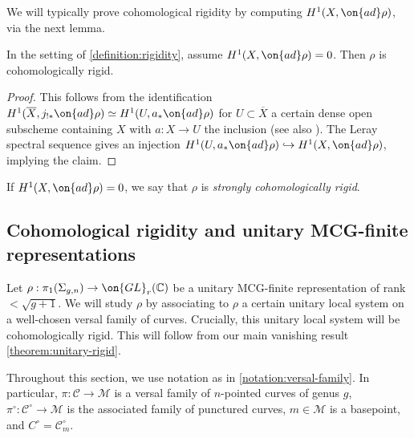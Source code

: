 We will typically prove cohomological rigidity by computing
$H^1(X, \on{ad}\rho)$, via the next lemma.
\begin{lemma}
\notready
	\label{lemma:vanishing-h1-implies-rigidity}
		In the setting of \autoref{definition:rigidity}, assume $H^1(X, \on{ad}\rho)
	= 0$. Then $\rho$ is
	cohomologically rigid.
\end{lemma}
\begin{proof}
	This follows from the identification
	$H^1(\overline{X}, j_{!*}\on{ad}\rho)\simeq H^1(U, a_*\on{ad}\rho)$ for
	$U \subset \overline{X}$ a certain dense open subscheme containing $X$
	with $a: X \to U$ the inclusion \cite[Remark
	2.4]{esnault2018cohomologically} (see also \cite[Remark
	4.8]{klevdalP:g-rigid-local-systems-are-integral}).
	The Leray spectral sequence gives an injection
	$H^1(U, a_*\on{ad}\rho) \hookrightarrow H^1(X, \on{ad}\rho)$, implying
	the claim.
\end{proof}
\begin{definition}
\notready
If $H^1(X, \on{ad}\rho)=0$, we say that $\rho$ is \emph{strongly cohomologically rigid}.
\end{definition}
\subsection{Cohomological rigidity and unitary MCG-finite representations}
\label{subsection:rigidity}

Let $\rho: \pi_1(\Sigma_{g,n})\to \on{GL}_r(\mathbb{C})$ be a unitary MCG-finite
representation of rank $<\sqrt{g+1}$. We will study $\rho$ by associating to $\rho$ a certain unitary local system on a well-chosen versal family of curves. Crucially, this unitary local system will be cohomologically rigid.
This will follow from our main vanishing result
\autoref{theorem:unitary-rigid}.

Throughout this section, we use notation as in
\autoref{notation:versal-family}. In particular, $\pi:\mathscr{C}\to
\mathscr{M}$ is a versal family of $n$-pointed curves of genus $g$,
$\pi^\circ: \mathscr{C}^\circ \to \mathscr{M}$ is the associated family of
punctured curves, $m \in \mathscr M$ is a basepoint, and $C^\circ = \mathscr
C_m^\circ$.

